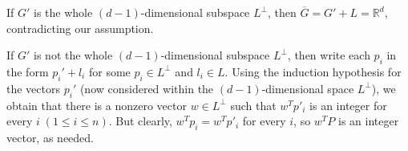 \documentclass{article}
\theoremstyle{definition}
\newcommand{\R}{\mathbb R}
\begin{document}
If $G'$ is the whole $(d-1)$-dimensional subspace $L^{\perp}$, then $\overline{G}=G'+L=\R^d$, contradicting our assumption.

If $G'$ is not the whole $(d-1)$-dimensional subspace $L^{\perp}$, then write each $p_i$ in the form $p_i'+ l_i$ for some $p_i\in L^{\perp}$ and $l_i\in L$. Using the induction hypothesis for the vectors $p_i'$ (now considered within the $(d-1)$-dimensional space $L^\perp$), we obtain that there is a nonzero vector $w\in L^{\perp}$ such that $w^Tp'_i$ is an integer for every $i\; (1\le i\le n)$. But clearly, $w^Tp_i=w^Tp'_i$ for every $i$, so $w^TP$ is an integer vector, as needed.
\end{document}
